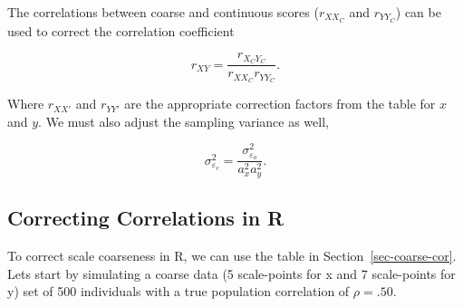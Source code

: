 \documentclass[
  letterpaper,
  DIV=11,
  numbers=noendperiod]{scrreprt}
\begin{document}
The correlations between coarse and continuous scores (\(r_{XX_C}\) and
\(r_{YY_C}\)) can be used to correct the correlation coefficient

\[
r_{XY} = \frac{r_{X_CY_C}}{r_{XX_C}r_{YY_C}}.
\]

Where \(r_{XX'}\) and \(r_{YY'}\) are the appropriate correction factors
from the table for \(x\) and \(y\). We must also adjust the sampling
variance as well,

\[
\sigma^2_{\varepsilon_c} = \frac{\sigma^2_{\varepsilon_o}}{a^2_x a^2_y}.
\]

\subsection{Correcting Correlations in
R}\label{correcting-correlations-in-r}

To correct scale coarseness in R, we can use the table in
Section~\ref{sec-coarse-cor}. Lets start by simulating a coarse data (5
scale-points for x and 7 scale-points for y) set of 500 individuals with
a true population correlation of \(\rho = .50\).
\end{document}
